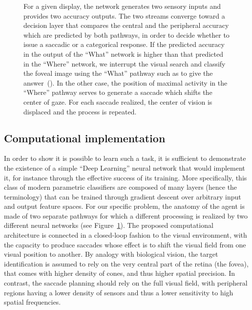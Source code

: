 \begin{figure}[t!]
{		\D
		For a given display, the network generates two sensory inputs and provides two accuracy outputs. The two streams converge toward a decision layer that compares the central and the peripheral accuracy which are predicted by both pathways, in order to decide whether to issue a saccadic or a categorical response. If the predicted accuracy in the output of the ``What'' network is higher than that predicted in the ``Where'' network,  we interrupt the visual search and classify the foveal image using the ``What'' pathway such as to give the answer~(\ANS ).  In the other case, the position of maximal activity in the ``Where'' pathway serves to generate a saccade which shifts the center of gaze. For each saccade realized, the center of vision is displaced and the process is repeated.%
		\label{fig:methods}}%
\end{figure}%
%
\subsection{Computational implementation}
%
In order to show it is possible to learn such a task, it is sufficient to demonstrate the existence of a simple ``Deep Learning'' neural network that would implement it, for instance through the effective success of its training. More specifically, this class of modern parametric classifiers are composed of many layers (hence the terminology) that can be trained through gradient descent over arbitrary input and output feature spaces. For our specific problem, the anatomy of the agent is made of two separate pathways for which a different processing is realized by two different neural networks (see Figure~\ref{fig:methods}). The proposed computational architecture is connected in a closed-loop fashion to the visual environment, with the capacity to produce saccades whose effect is to shift the visual field from one visual position to another. %
By analogy with biological vision, the target identification is assumed to rely on the very central part of the retina (the fovea), that comes with higher density of cones, and thus higher spatial precision. In contrast, the saccade planning should rely on the full visual field, with peripheral regions having a lower density of sensors and thus a lower sensitivity to high spatial frequencies.

